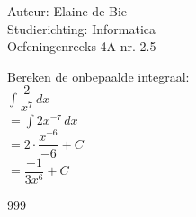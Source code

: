 \documentclass[a4paper]{article}
\begin{document}
  
\noindent \large Auteur: Elaine de Bie \\
\noindent \large Studierichting: Informatica\\
\noindent \large Oefeningenreeks 4A nr. 2.5\\



\medskip


\normalsize



Bereken de onbepaalde integraal: \\

$ \displaystyle\int \dfrac{2}{x^7} \, dx $ \\

$ = \displaystyle\int 2x^{-7} \, dx $\\

$ = 2 \cdot \dfrac{x^{-6}}{-6} + C $\\

$ = \dfrac{-1}{3x^6} + C $\\






\begin{thebibliography}{999}
\end{thebibliography}
\end{document}
